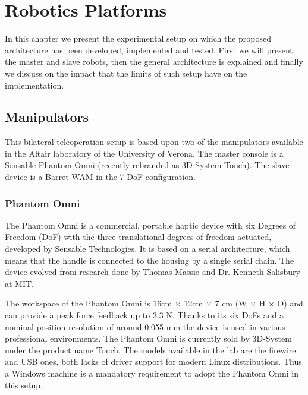 \chapter{Robotics Platforms}
In this chapter we present the experimental setup on which the proposed architecture has been developed, implemented and tested.
First we will present the master and slave robots,  then the general architecture is explained and finally we discuss on the impact that the limits of such setup have on the implementation.

\section{Manipulators}
This bilateral teleoperation setup is based upon two of the manipulators available in the Altair laboratory of the University of Verona.
The master console is a Sensable Phantom Omni (recently rebranded as 3D-System Touch).
The slave device is a Barret WAM in the 7-DoF configuration.

\subsection{Phantom Omni}
The Phantom Omni is a commercial, portable haptic device with six Degrees of Freedom (DoF) with the three translational degrees of freedom actuated, developed by Sensable Technologies. It is based on a serial architecture, which means that the handle is connected to the housing by a single serial chain.
The device evolved from research done by Thomas Massie and Dr. Kenneth Salisbury at MIT.

The workspace of the Phantom Omni is 16cm $\times$ 12cm $\times$ 7 cm (W $\times$ H $\times$ D) and can provide a peak force feedback up to 3.3 N. Thanks to its six DoFs and a nominal position resolution of around 0.055 mm the device is used in various professional environments. The Phantom Omni is currently sold by 3D-System under the product name Touch.
The models available in the lab are the firewire  and USB ones, both lacks of driver support for modern Linux distributions. Thus a Windows machine is a mandatory requirement to adopt the Phantom Omni in this setup.

